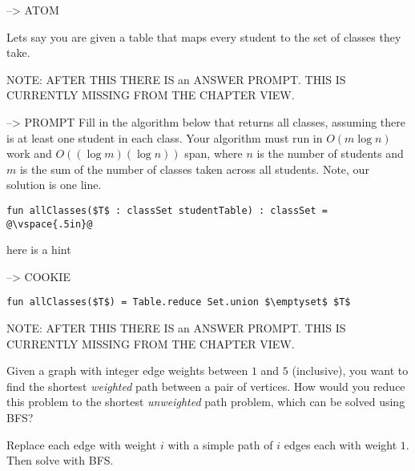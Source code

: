 \begin{problem}[4p][Classes]  --> ATOM



Lets say you are given a table that maps every student to the set of
classes they take. 

NOTE: AFTER THIS THERE IS an ANSWER PROMPT.  THIS IS CURRENTLY MISSING FROM THE CHAPTER VIEW.

\answer --> PROMPT
Fill in the algorithm below that returns all classes,
assuming there is at least one student in each class.  Your algorithm
must run in $O(m \log n)$ work and $O((\log m)(\log n))$ span, where
$n$ is the number of students and $m$ is the sum of the number of
classes taken across all students.    Note, our solution is one line.


\vspace{.3in}
\begin{lstlisting}[numbers=none]
fun allClasses($T$ : classSet studentTable) : classSet = 
@\vspace{.5in}@
\end{lstlisting}

\explain

\hint 
here is a hint

\sol --> COOKIE
\begin{lstlisting}[numbers=none]
fun allClasses($T$) = Table.reduce Set.union $\emptyset$ $T$
\end{lstlisting}

\end{problem}



\begin{problem}

NOTE: AFTER THIS THERE IS an ANSWER PROMPT.  THIS IS CURRENTLY MISSING FROM THE CHAPTER VIEW.

\answer

Given a graph with integer edge weights between $1$ and $5$
(inclusive), you want to find the shortest \emph{weighted} path
between a pair of vertices.  How would you reduce this problem to the
shortest \emph{unweighted} path problem, which can be solved using
BFS?

\sol
  Replace each edge with weight $i$ with a simple path of $i$ edges
  each with weight $1$. Then solve with BFS.
\end{problem}



